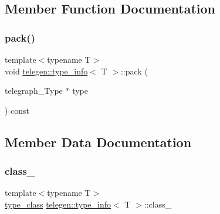 \subsection{Member Function Documentation}
\mbox{\label{structtelegen_1_1type__info_a5ed3d1c30970a84b6507c30890d74f86}} 
\subsubsection{\texorpdfstring{pack()}{pack()}}
{\footnotesize\ttfamily template$<$typename T$>$ \\
void \hyperlink{structtelegen_1_1type__info}{telegen\+::type\+\_\+info}$<$ T $>$\+::pack (\begin{DoxyParamCaption}\item[{telegraph\+\_\+\+Type $\ast$}]{type }\end{DoxyParamCaption}) const\hspace{0.3cm}{\ttfamily [inline]}}



\subsection{Member Data Documentation}
\mbox{\label{structtelegen_1_1type__info_a7b45b05aeac67bd7700d3b140455f77f}} 
\subsubsection{\texorpdfstring{class\+\_\+}{class\_}}
{\footnotesize\ttfamily template$<$typename T$>$ \\
\hyperlink{namespacetelegen_a72d4e69f0be1731e1a851a96dec858d8}{type\+\_\+class} \hyperlink{structtelegen_1_1type__info}{telegen\+::type\+\_\+info}$<$ T $>$\+::class\+\_\+}

\mbox{\label{structtelegen_1_1type__info_a57e2f47e182fd9099f09ac086fd88be8}} 
